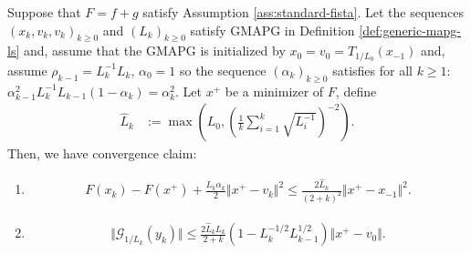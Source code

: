 \documentclass[12pt]{report}
\begin{document}
        \begin{theorem}\label{thm:gmapg-specialized-cnvg}
            Suppose that $F = f + g$ satisfy Assumption \ref{ass:standard-fista}. 
            Let the sequences $(x_k, v_k, v_k)_{k \ge 0}$ and $(L_k)_{k \ge 0}$ satisfy GMAPG in Definition \ref{def:generic-mapg-ls} and, assume that the GMAPG is initialized by $x_0 = v_0 = T_{1/L_0}(x_{-1})$ and, assume $\rho_{k - 1} = L_{k}^{-1}L_{k}$, $\alpha_0 = 1$ so the sequence $(\alpha_k)_{k \ge 0}$ satisfies for all $k\ge 1$: $\alpha_{k - 1}^2L_k^{-1}L_{k - 1}(1 - \alpha_k) = \alpha_k^2$. 
            Let $x^+$ be a minimizer of $F$, define 
            \begin{align*}
                \widehat L_k &:= \max\left(
                    L_0, \left(
                        \frac{1}{k} \sum_{i = 1}^{k} \sqrt{L_i^{-1}}
                    \right)^{-2}
                \right). 
            \end{align*}
            Then, we have convergence claim: 
            \begin{enumerate}
                \item \begin{align*}
                    F(x_k) - F(x^+) + \frac{L_k\alpha_k}{2}\Vert x^+ - v_k\Vert^2 \le 
                    \frac{2\widehat L_k}{(2 + k)^2}\Vert x^+ - x_{-1}\Vert^2.
                \end{align*}
                \item 
                \begin{align*}
                    \Vert \mathcal G_{1/L_k}(y_k)\Vert \le 
                    \frac{2\widehat L_k L_k}{2 + k}
                    \left(
                        1 - L_k^{-1/2}L_{k - 1}^{1/2}
                    \right)
                    \Vert x^+ - v_0\Vert. 
                \end{align*}
            \end{enumerate}
        \end{theorem}
\end{document}
